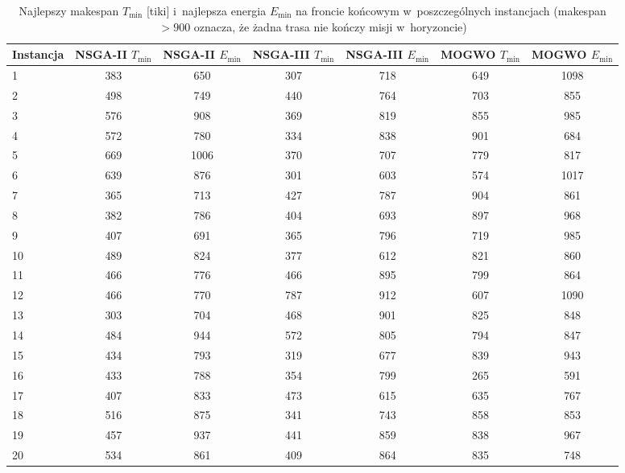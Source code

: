 \begin{table}[htbp]
    \centering
    \caption{Najlepszy makespan $T_{\min}$ [tiki] i~najlepsza energia $E_{\min}$ na froncie końcowym w~poszczególnych instancjach (makespan $> 900$ oznacza, że żadna trasa nie kończy misji w~horyzoncie)}
    \label{tab:per_run_objectives}
    \begin{tabular}{l c c c c c c}
        \hline
        Instancja & NSGA-II $T_{\min}$ & NSGA-II $E_{\min}$ & NSGA-III $T_{\min}$ & NSGA-III $E_{\min}$ & MOGWO $T_{\min}$ & MOGWO $E_{\min}$ \\
        \hline
        1 & 383 & 650 & 307 & 718 & 649 & 1098 \\
        2 & 498 & 749 & 440 & 764 & 703 & 855 \\
        3 & 576 & 908 & 369 & 819 & 855 & 985 \\
        4 & 572 & 780 & 334 & 838 & 901 & 684 \\
        5 & 669 & 1006 & 370 & 707 & 779 & 817 \\
        6 & 639 & 876 & 301 & 603 & 574 & 1017 \\
        7 & 365 & 713 & 427 & 787 & 904 & 861 \\
        8 & 382 & 786 & 404 & 693 & 897 & 968 \\
        9 & 407 & 691 & 365 & 796 & 719 & 985 \\
        10 & 489 & 824 & 377 & 612 & 821 & 860 \\
        11 & 466 & 776 & 466 & 895 & 799 & 864 \\
        12 & 466 & 770 & 787 & 912 & 607 & 1090 \\
        13 & 303 & 704 & 468 & 901 & 825 & 848 \\
        14 & 484 & 944 & 572 & 805 & 794 & 847 \\
        15 & 434 & 793 & 319 & 677 & 839 & 943 \\
        16 & 433 & 788 & 354 & 799 & 265 & 591 \\
        17 & 407 & 833 & 473 & 615 & 635 & 767 \\
        18 & 516 & 875 & 341 & 743 & 858 & 853 \\
        19 & 457 & 937 & 441 & 859 & 838 & 967 \\
        20 & 534 & 861 & 409 & 864 & 835 & 748 \\
        \hline
    \end{tabular}
\end{table}
